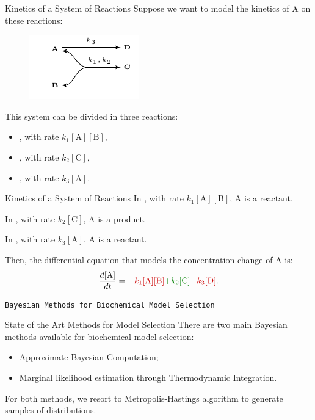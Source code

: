\documentclass{beamer}
\begin{document}
\begin{frame}{Kinetics of a System of Reactions}
Suppose we want to model the kinetics of A on these reactions:
\begin{figure}
    \includegraphics[scale=1.5]{fundamental_concepts/system_reactions.pdf}
\end{figure}
This system can be divided in three reactions:
\begin{itemize}
    \pause
    \item{, with rate $k_1[\text{A}][\text{B}]$,}
    \pause
    \item{, with rate $k_2[\text{C}]$,}
    \pause
    \item{, with rate $k_3[\text{A}]$.}
\end{itemize}
\end{frame}

\begin{frame}{Kinetics of a System of Reactions}
In , with rate 
{\color{red!80!black}$k_1[\text{A}][\text{B}]$}, A is a reactant.
\pause

In , with rate 
{\color{green!50!black}$k_2[\text{C}]$}, A is a product.
\pause

In , with rate 
{\color{red!80!black}$k_3[\text{A}]$}, A is a reactant.
\pause

Then, the differential equation that models the concentration change of 
A is:
\pause
\begin{equation*}
    \frac{d[\text{A}]}{dt} = 
        {\color{red!80!black}- k_1[\text{A}][\text{B}]}
        {\color{green!50!black}+ k_2[\text{C}]}
        {\color{red!80!black}- k_3[\text{D}]}.
\end{equation*}
\end{frame}


\begin{frame}{}
\begin{center}
\texttt{Bayesian Methods for Biochemical Model Selection}
\end{center}
\end{frame}

\begin{frame}{State of the Art Methods for Model Selection}
There are two main Bayesian methods available for biochemical model 
selection:
\begin{itemize}
\pause
\item{Approximate Bayesian Computation;}

\pause
\item{Marginal likelihood estimation through Thermodynamic Integration.}
\end{itemize}

\pause
For both methods, we resort to Metropolis-Hastings algorithm to generate
samples of distributions.
\end{frame}
\end{document}

